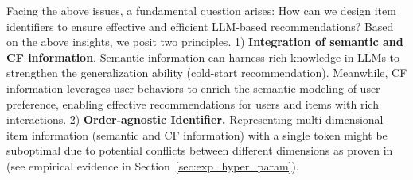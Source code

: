 Facing the above issues, a fundamental question arises: 
How can we design item identifiers to ensure effective and efficient LLM-based recommendations? 
Based on the above insights, we posit two principles. 
1) \textbf{Integration of semantic and CF information}. 
Semantic information can harness rich knowledge in LLMs to strengthen the generalization ability (\eg cold-start recommendation). 
Meanwhile, CF information leverages user behaviors to enrich the semantic modeling of user preference, enabling effective recommendations for users and items with rich interactions. 
2) \textbf{Order-agnostic Identifier.} 
Representing multi-dimensional item information (\eg semantic and CF information) with a single token might be suboptimal due to potential conflicts between different dimensions as proven in~\cite{wang2024learnable,zhang2022re4} (see empirical evidence in Section~\ref{sec:exp_hyper_param}). 
